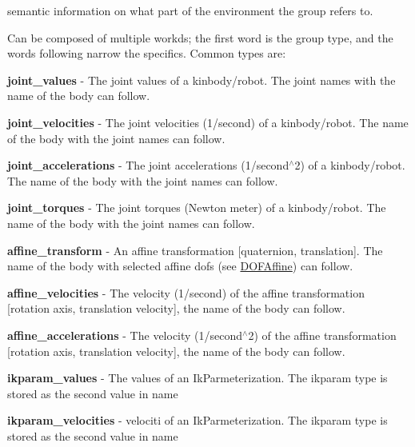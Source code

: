 semantic information on what part of the environment the group refers to. 

Can be composed of multiple workds; the first word is the group type, and the words following narrow the specifics. Common types are:


\begin{DoxyItemize}
\item {\bfseries joint\_\-values} -\/ The joint values of a kinbody/robot. The joint names with the name of the body can follow.
\item {\bfseries joint\_\-velocities} -\/ The joint velocities (1/second) of a kinbody/robot. The name of the body with the joint names can follow.
\item {\bfseries joint\_\-accelerations} -\/ The joint accelerations (1/second$^\wedge$2) of a kinbody/robot. The name of the body with the joint names can follow.
\item {\bfseries joint\_\-torques} -\/ The joint torques (Newton meter) of a kinbody/robot. The name of the body with the joint names can follow.
\item {\bfseries affine\_\-transform} -\/ An affine transformation \mbox{[}quaternion, translation\mbox{]}. The name of the body with selected affine dofs (see \hyperlink{namespaceOpenRAVE_a3016e2185103f3c1bdc5e4482893ca98}{DOFAffine}) can follow.
\item {\bfseries affine\_\-velocities} -\/ The velocity (1/second) of the affine transformation \mbox{[}rotation axis, translation velocity\mbox{]}, the name of the body can follow.
\item {\bfseries affine\_\-accelerations} -\/ The velocity (1/second$^\wedge$2) of the affine transformation \mbox{[}rotation axis, translation velocity\mbox{]}, the name of the body can follow.
\item {\bfseries ikparam\_\-values} -\/ The values of an IkParmeterization. The ikparam type is stored as the second value in name
\item {\bfseries ikparam\_\-velocities} -\/ velociti of an IkParmeterization. The ikparam type is stored as the second value in name 
\end{DoxyItemize}